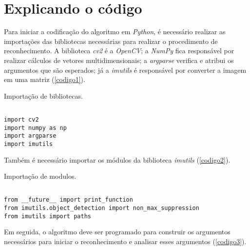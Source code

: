 \section{\textbf{Explicando o código}}
\label{explicacao-codigo}


Para iniciar a codificação do algoritmo em \textit{Python}, é necessário realizar as importações das bibliotecas necessárias para realizar o procedimento de reconhecimento. A biblioteca \textit{cv2} é a \textit{OpenCV}; a \textit{NumPy} fica responsável por realizar cálculos de vetores multidimensionais; a \textit{argparse} verifica e atribui os argumentos que são esperados; já a \textit{imutils} é responsável por converter a imagem em uma matriz (\autoref{codigo1}).

\begin{listing}[ht]
\caption{\label{codigo1}Importação de bibliotecas.}
\begin{verbatim}

import cv2
import numpy as np
import argparse
import imutils

\end{verbatim}
\end{listing}

Também é necessário importar os módulos da biblioteca \textit{imutils} (\autoref{codigo2}).


\begin{listing}[ht]
\caption{\label{codigo2}Importação de modulos.}
\begin{verbatim}

from __future__ import print_function
from imutils.object_detection import non_max_suppression
from imutils import paths

\end{verbatim}
\end{listing}

Em seguida, o algoritmo deve ser programado para construir os argumentos necessários para iniciar o reconhecimento e analisar esses argumentos (\autoref{codigo3}).

